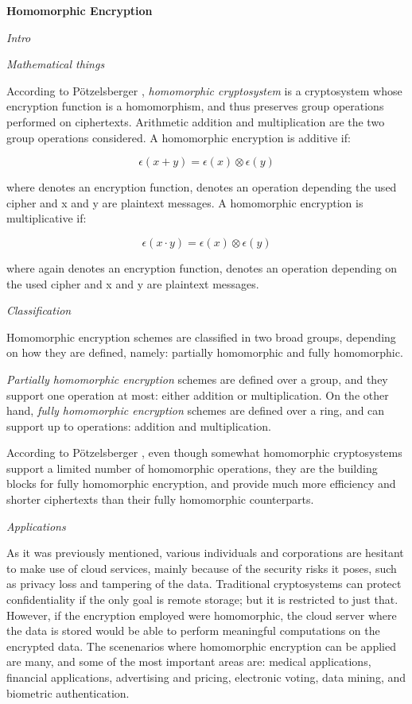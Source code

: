 \textbf{Homomorphic Encryption}

\textit{Intro}

\textit{Mathematical things}

According to P{\"o}tzelsberger \cite{potzelsberger2013kv},  \textit{homomorphic cryptosystem} is a cryptosystem whose encryption function is a homomorphism, and thus preserves group operations performed on ciphertexts. Arithmetic addition and multiplication are the two group operations considered.  A homomorphic encryption is additive if:

\begin{equation}
\epsilon(x+y) = \epsilon(x)\otimes \epsilon(y)
\end{equation}

where \epsilon denotes an encryption function, \otimes denotes an operation depending the used cipher and x and y are plaintext messages. A homomorphic encryption is multiplicative if:

\begin{equation}
\epsilon(x \cdot y) = \epsilon(x) \otimes \epsilon(y)
\end{equation}

where again \epsilon denotes an encryption function, \otimes denotes an operation depending on the used cipher and x and y are plaintext messages.

\textit{Classification}

Homomorphic encryption schemes are classified in two broad groups, depending on how they are defined, namely: partially homomorphic and fully homomorphic. 

\textit{Partially homomorphic encryption} schemes are defined over a group, and they support one operation at most: either addition or multiplication. On the other hand, \textit{fully homomorphic encryption} schemes are defined over a ring, and can support up to operations: addition and multiplication.

According to P{\"o}tzelsberger \cite{potzelsberger2013kv}, even though somewhat homomorphic cryptosystems support a limited number of homomorphic operations, they are the building blocks for fully homomorphic encryption, and provide much more efficiency and shorter ciphertexts than their fully homomorphic counterparts. 

\textit{Applications}

As it was previously mentioned, various individuals and corporations are hesitant to make use of cloud services, mainly because of the security risks it poses, such as privacy loss and tampering of the data. Traditional cryptosystems can protect confidentiality if the only goal is remote storage; but it is restricted to just that. However, if the encryption employed were homomorphic, the cloud server where the data is stored would be able to perform meaningful computations on the encrypted data.  The scenenarios where homomorphic encryption can be applied are many, and some of the most important areas are: medical applications, financial applications, advertising and pricing, electronic voting, data mining, and biometric authentication.

